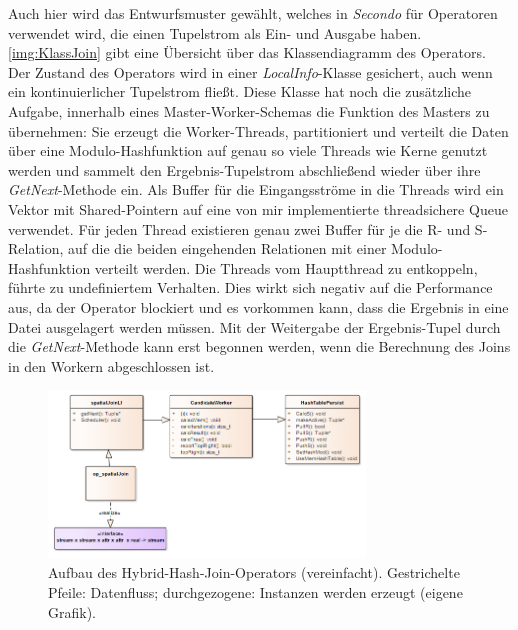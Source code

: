 \documentclass[a4paper,12pt,twoside]{article}
\newcommand{\Fb}[1]{\textit{#1}} %
\begin{document}
Auch hier wird das Entwurfsmuster gewählt, welches in \Fb{Secondo} für Operatoren verwendet wird, die einen Tupelstrom als Ein- und Ausgabe haben. \autoref{img:KlassJoin} gibt eine Übersicht über das Klassendiagramm des Operators. Der Zustand des Operators wird in einer \Fb{LocalInfo}-Klasse gesichert, auch wenn ein kontinuierlicher Tupelstrom fließt. Diese Klasse hat noch die zusätzliche Aufgabe, innerhalb eines Master-Worker-Schemas die Funktion des Masters zu übernehmen: Sie erzeugt die Worker-Threads, partitioniert und verteilt die Daten über eine Modulo-Hashfunktion auf genau so viele Threads wie Kerne genutzt werden und sammelt den Ergebnis-Tupelstrom abschließend wieder über ihre \Fb{GetNext}-Methode ein. Als Buffer für die Eingangsströme in die Threads wird ein Vektor mit Shared-Pointern auf eine von mir implementierte threadsichere Queue verwendet. Für jeden Thread existieren genau zwei Buffer für je die R- und S-Relation, auf die die beiden eingehenden Relationen mit einer Modulo-Hashfunktion verteilt werden. Die Threads vom Hauptthread zu entkoppeln, führte zu undefiniertem Verhalten. Dies wirkt sich negativ auf die Performance aus, da der Operator blockiert und es vorkommen kann, dass die Ergebnis in eine Datei ausgelagert werden müssen. Mit der Weitergabe der Ergebnis-Tupel durch die \Fb{GetNext}-Methode kann erst begonnen werden, wenn die Berechnung des Joins in den Workern abgeschlossen ist. 

\begin{figure}
	\centering
	\includegraphics[width=0.75\textwidth]{Bilder/hybridJoin.png}
	\caption{Aufbau des Hybrid-Hash-Join-Operators (vereinfacht). Gestrichelte Pfeile: Datenfluss; durchgezogene: Instanzen werden erzeugt (eigene Grafik).}
	\label{img:KlassJoin}
\end{figure}
\end{document}
